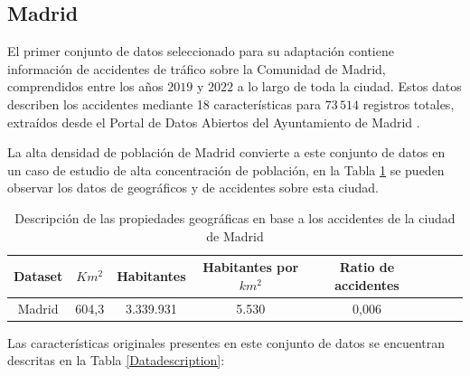 \subsection*{Madrid}

El primer conjunto de datos seleccionado para su adaptación contiene información de accidentes de tráfico sobre la Comunidad de Madrid, comprendidos entre los años $2019$ y $2022$ a lo largo de toda la ciudad. Estos datos describen los accidentes mediante 18 características para $73\,514$ registros totales, extraídos desde el Portal de Datos Abiertos del Ayuntamiento de Madrid \cite{InfoDatasetMadrid}. 

La alta densidad de población de Madrid convierte a este conjunto de datos en un caso de estudio de alta concentración de población, en la Tabla \ref{Madrid_statistics} se pueden observar los datos de geográficos y de accidentes sobre esta ciudad.

\begin{table}[ht]
	\begin{center}
		\begin{tabular}{|c|c||c|c|c|c|c|c|}
			\hline
			\textbf{Dataset} & \textbf{$Km^2$} & \textbf{Habitantes} & \textbf{Habitantes por $km^2$} & \textbf{Ratio de accidentes}
			\\ \hline \hline
			
			Madrid & 604,3 & 3.339.931 & 5.530 & 0,006 \\ \hline
			
		\end{tabular}
	\end{center}
	\caption{Descripción de las propiedades geográficas en base a los accidentes de la ciudad de Madrid}
	\label{Madrid_statistics}
\end{table}

Las características originales presentes en este conjunto de datos se encuentran descritas en la Tabla \ref{Datadescription}:

